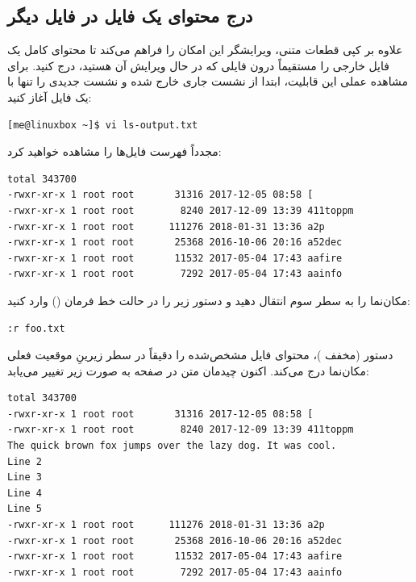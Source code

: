 \subsection{درج محتوای یک فایل در فایل دیگر}

علاوه بر کپی قطعات متنی، ویرایشگر  این امکان را فراهم می‌کند تا محتوای کامل یک فایل خارجی را مستقیماً درون فایلی که در حال ویرایش آن هستید، درج کنید. برای مشاهده عملی این قابلیت، ابتدا از نشست جاری خارج شده و نشست جدیدی را تنها با یک فایل آغاز کنید:

\begin{latin}
\begin{lstlisting}
[me@linuxbox ~]$ vi ls-output.txt
\end{lstlisting}
\end{latin}

مجدداً فهرست فایل‌ها را مشاهده خواهید کرد:

\begin{latin}
\begin{lstlisting}
total 343700
-rwxr-xr-x 1 root root       31316 2017-12-05 08:58 [
-rwxr-xr-x 1 root root        8240 2017-12-09 13:39 411toppm
-rwxr-xr-x 1 root root      111276 2018-01-31 13:36 a2p
-rwxr-xr-x 1 root root       25368 2016-10-06 20:16 a52dec
-rwxr-xr-x 1 root root       11532 2017-05-04 17:43 aafire
-rwxr-xr-x 1 root root        7292 2017-05-04 17:43 aainfo
\end{lstlisting}
\end{latin}

مکان‌نما را به سطر سوم انتقال دهید و دستور زیر را در حالت خط فرمان () وارد کنید:

\begin{latin}
\begin{lstlisting}
:r foo.txt
\end{lstlisting}
\end{latin}

دستور  (مخفف )، محتوای فایل مشخص‌شده را دقیقاً در سطر زیرینِ موقعیت فعلی مکان‌نما درج می‌کند. اکنون چیدمان متن در صفحه به صورت زیر تغییر می‌یابد:

\begin{latin}
\begin{lstlisting}
total 343700
-rwxr-xr-x 1 root root       31316 2017-12-05 08:58 [
-rwxr-xr-x 1 root root        8240 2017-12-09 13:39 411toppm
The quick brown fox jumps over the lazy dog. It was cool.
Line 2
Line 3
Line 4
Line 5
-rwxr-xr-x 1 root root      111276 2018-01-31 13:36 a2p
-rwxr-xr-x 1 root root       25368 2016-10-06 20:16 a52dec
-rwxr-xr-x 1 root root       11532 2017-05-04 17:43 aafire
-rwxr-xr-x 1 root root        7292 2017-05-04 17:43 aainfo
\end{lstlisting}
\end{latin}

